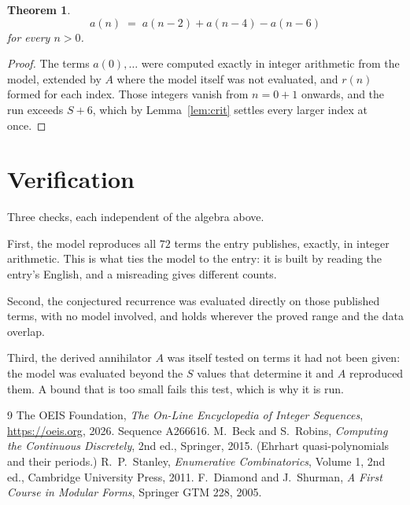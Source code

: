 \documentclass[11pt,a4paper]{article}
\theoremstyle{plain}
\newtheorem{theorem}{Theorem}
\theoremstyle{definition}
\begin{document}
\begin{theorem}
\[
a(n)\;=\;a(n-2) + a(n-4) - a(n-6)
\]
for every $n>0$.
\end{theorem}

\begin{proof}
The terms $a(0),\dots$ were computed exactly in integer arithmetic from the model, extended by
$A$ where the model itself was not evaluated, and $r(n)$ formed for each index. Those integers
vanish from $n=0+1$ onwards, and the run exceeds $S+6$, which by
Lemma~\ref{lem:crit} settles every larger index at once.
\end{proof}

\section{Verification}

Three checks, each independent of the algebra above.

First, the model reproduces all $72$ terms the entry publishes, exactly, in integer
arithmetic. This is what ties the model to the entry: it is built by reading the entry's
English, and a misreading gives different counts.

Second, the conjectured recurrence was evaluated directly on those published terms, with no
model involved, and holds wherever the proved range and the data overlap.

Third, the derived annihilator $A$ was itself tested on terms it had not been given: the model
was evaluated beyond the $S$ values that determine it and $A$ reproduced them. A bound that is
too small fails this test, which is why it is run.

\begin{thebibliography}{9}
 The OEIS Foundation, \emph{The On-Line Encyclopedia of Integer
Sequences}, \url{https://oeis.org}, 2026. Sequence A266616.
 M.~Beck and S.~Robins, \emph{Computing the Continuous Discretely},
2nd ed., Springer, 2015. (Ehrhart quasi-polynomials and their periods.)
 R.~P.~Stanley, \emph{Enumerative Combinatorics}, Volume 1, 2nd ed.,
Cambridge University Press, 2011.
 F.~Diamond and J.~Shurman, \emph{A First Course in Modular Forms},
Springer GTM 228, 2005.
\end{thebibliography}
\end{document}
